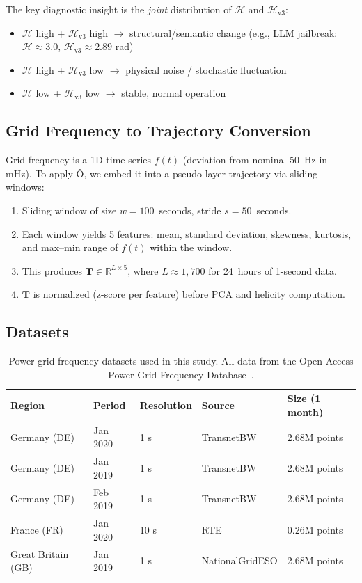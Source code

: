 \documentclass[11pt,a4paper]{article}
\begin{document}
The key diagnostic insight is the \emph{joint} distribution of $\mathcal{H}$ and $\mathcal{H}_{\text{v3}}$:
\begin{itemize}
    \item $\mathcal{H}$ high + $\mathcal{H}_{\text{v3}}$ high $\rightarrow$ structural/semantic change (e.g., LLM jailbreak: $\mathcal{H} \approx 3.0$, $\mathcal{H}_{\text{v3}} \approx 2.89$ rad)
    \item $\mathcal{H}$ high + $\mathcal{H}_{\text{v3}}$ low $\rightarrow$ physical noise / stochastic fluctuation
    \item $\mathcal{H}$ low + $\mathcal{H}_{\text{v3}}$ low $\rightarrow$ stable, normal operation
\end{itemize}

\subsection{Grid Frequency to Trajectory Conversion}

Grid frequency is a 1D time series $f(t)$ (deviation from nominal 50~Hz in mHz). To apply Ô, we embed it into a pseudo-layer trajectory via sliding windows:

\begin{enumerate}
    \item Sliding window of size $w = 100$~seconds, stride $s = 50$~seconds.
    \item Each window yields 5 features: mean, standard deviation, skewness, kurtosis, and max--min range of $f(t)$ within the window.
    \item This produces $\mathbf{T} \in \mathbb{R}^{L \times 5}$, where $L \approx 1{,}700$ for 24~hours of 1-second data.
    \item $\mathbf{T}$ is normalized (z-score per feature) before PCA and helicity computation.
\end{enumerate}

\subsection{Datasets}

\begin{table}[H]
\centering
\caption{Power grid frequency datasets used in this study. All data from the Open Access Power-Grid Frequency Database~\cite{power_grid_freq_db}.}
\label{tab:datasets}
\begin{tabular}{lllll}
\toprule
\textbf{Region} & \textbf{Period} & \textbf{Resolution} & \textbf{Source} & \textbf{Size (1 month)} \\
\midrule
Germany (DE) & Jan 2020 & 1 s & TransnetBW & 2.68M points \\
Germany (DE) & Jan 2019 & 1 s & TransnetBW & 2.68M points \\
Germany (DE) & Feb 2019 & 1 s & TransnetBW & 2.68M points \\
France (FR) & Jan 2020 & 10 s & RTE & 0.26M points \\
Great Britain (GB) & Jan 2019 & 1 s & NationalGridESO & 2.68M points \\
\bottomrule
\end{tabular}
\end{table}
\end{document}
